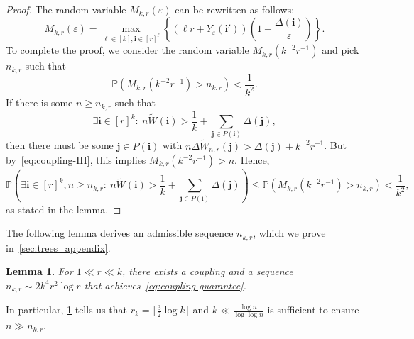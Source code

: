 \documentclass[11pt]{article}
\newtheorem{lemma}[theorem]{Lemma}
\theoremstyle{definition}
\theoremstyle{remark}
\theoremstyle{remark}
\numberwithin{theorem}{section}
\providecommand{\P}{}
\renewcommand{\P}{\mathbb{P}}
\begin{document}
\begin{proof}
    The random variable $M_{k,r}(\varepsilon)$ can be rewritten as follows:
    \[
    M_{k,r}(\varepsilon)=\max_{\ell\in[k],\bm i\in[r]^\ell}\left\{(\ell r+Y_{\varepsilon}(\bm i'))\left(1+\frac{\Delta(\bm i)}\varepsilon\right)\right\}.
    \]
    To complete the proof, we consider the random variable $M_{k,r}(k^{-2}r^{-1})$ and pick $n_{k,r}$ such that
    \[
    \P(M_{k,r}(k^{-2}r^{-1})>n_{k,r})<\frac1{k^2}.
    \]
    If there is some $n\ge n_{k,r}$ such that
    \[
    \exists \bm i\in [r]^k:\ n\widetilde W(\bm i)>\frac1k+\sum_{\bm j\in P(\bm i)}\Delta(\bm j),
    \]
    then there must be some $\bm j\in P(\bm i)$ with $n\Delta\widetilde W_{n,r}(\bm j)>\Delta(\bm j)+k^{-2}r^{-1}$. But by~\eqref{eq:coupling-IH}, this
    implies $M_{k,r}(k^{-2}r^{-1})>n$.
    Hence,
    \[
    \P\left(\exists \bm i\in [r]^k,n\ge n_{k,r}:\ n\widetilde W(\bm i)>\frac1k+\sum_{\bm j\in P(\bm i)}\Delta(\bm j)\right)\le \P(M_{k,r}(k^{-2}r^{-1})>n_{k,r})<\frac1{k^2},
    \]
    as stated in the lemma.
\end{proof}
The following lemma derives an admissible sequence $n_{k,r}$, which we prove in~\cref{sec:trees_appendix}.
\begin{lemma}\label{lem:coupling-admissible}
    For $1\ll r\ll k$, there exists a coupling and a sequence $n_{k,r}\sim 2k^4r^2\log r$ that achieves~\eqref{eq:coupling-guarantee}.
\end{lemma}
In particular, \cref{lem:coupling-admissible} tells us that $r_k=\lceil\frac{3}{2}\log k\rceil$ and $k\ll \frac{\log n}{\log\log n}$ is sufficient to ensure $n\gg n_{k,r}$. 
\end{document}
